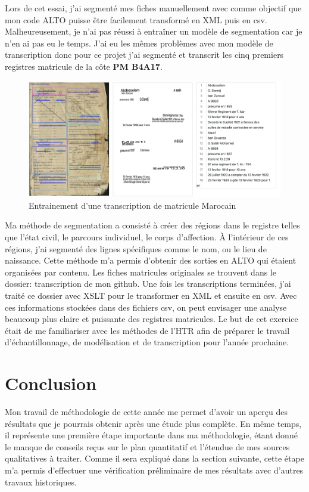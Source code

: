  Lors de cet essai, j’ai segmenté mes fiches manuellement avec comme objectif que mon code ALTO puisse être facilement transformé en XML puis en csv. Malheureusement, je n’ai pas réussi à entraîner un modèle de segmentation car je n’en ai pas eu le temps. J’ai eu les mêmes problèmes avec mon modèle de transcription donc pour ce projet j’ai segmenté et transcrit les cinq premiers registres matricule de la côte \textbf{PM B4A17}.  
\begin{figure}[H]
    \centering
    \includegraphics[scale=0.43]{Images/seg.png}
    \caption{Entrainement d'une transcription de matricule Marocain}
    \label{fig:Segmat}
\end{figure}
Ma méthode de segmentation a consisté à créer des régions dans le registre telles que l’état civil, le parcours individuel, le corps d’affection. À l'intérieur de ces régions, j’ai segmenté des lignes spécifiques comme le nom, ou le lieu de naissance. Cette méthode m'a permis d’obtenir des sorties en ALTO qui étaient organisées par contenu. Les fiches matricules originales se trouvent dans le dossier: transcription de mon github. Une fois les transcriptions terminées, j’ai traité ce dossier avec XSLT pour le transformer en XML et ensuite en csv. Avec ces informations stockées dans des fichiers csv, on peut envisager une analyse beaucoup plus claire et puissante des registres matricules. Le but de cet exercice était de me familiariser avec les méthodes de l’HTR afin de préparer le travail d'échantillonnage, de modélisation et de transcription pour l'année prochaine.   
  

\section{Conclusion}
Mon travail de méthodologie de cette année me permet d’avoir un aperçu des résultats que je pourrais obtenir après une étude plus complète. En même temps, il représente une première étape importante dans ma méthodologie, étant donné le manque de conseils reçus sur le plan quantitatif et l'étendue de mes sources qualitatives à traiter. Comme il sera expliqué dans la section suivante, cette étape m'a permis d'effectuer une vérification préliminaire de mes résultats avec d'autres travaux historiques.
